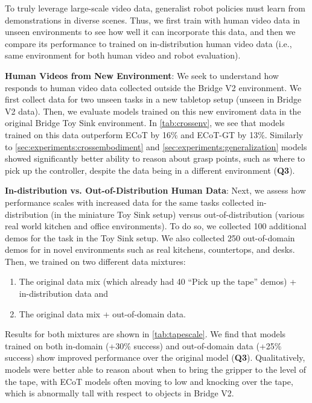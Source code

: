 To truly leverage large-scale video data, generalist robot policies must learn from demonstrations in diverse scenes. Thus, we first train \ACRO with human video data in unseen environments to see how well it can incorporate this data, and then we compare its performance to \ACRO trained on in-distribution human video data (i.e., same environment for both human video and robot evaluation).

\smallskip \noindent \textbf{Human Videos from New Environment}: We seek to understand how \ACRO responds to human video data collected outside the Bridge 
V2 environment. We first collect data for two unseen tasks in a new tabletop setup (unseen in Bridge V2 data). Then, we evaluate models trained on this new enviroment data in the original Bridge Toy Sink environment. In \cref{tab:crossenv}, we see that models trained on this data outperform ECoT by 16\% and ECoT-GT by 13\%. Similarly to \cref{sec:experiments:crossembodiment} and \cref{sec:experiments:generalization} \ACRO models showed significantly better ability to reason about grasp points, such as where to pick up the controller, despite the data being in a different environment (\textbf{Q3}).

\smallskip \noindent \textbf{In-distribution vs. Out-of-Distribution Human Data}: Next, we assess how \ACRO performance scales with increased data for the same tasks collected in-distribution (in the miniature Toy Sink setup) versus out-of-distribution (various real world kitchen and office environments). To do so, we collected 100 additional demos for the  task in the Toy Sink setup. We also collected 250 out-of-domain demos for  in novel environments such as real kitchens, countertops, and desks. Then, we trained \ACRO on two different data mixtures:
\begin{enumerate}
    \item The original \ACRO data mix (which already had 40 ``Pick up the tape'' demos) + in-distribution data and 
    \item The original \ACRO data mix + out-of-domain data.
\end{enumerate}

Results for both mixtures are shown in \cref{tab:tapescale}. We find that \ACRO models trained on both in-domain (+30\% success) and out-of-domain data (+25\% success) show improved performance over the original model (\textbf{Q3}). Qualitatively, \ACRO models were better able to reason about when to bring the gripper to the level of the tape, with ECoT models often moving to low and knocking over the tape, which is abnormally tall with respect to objects in Bridge V2.


